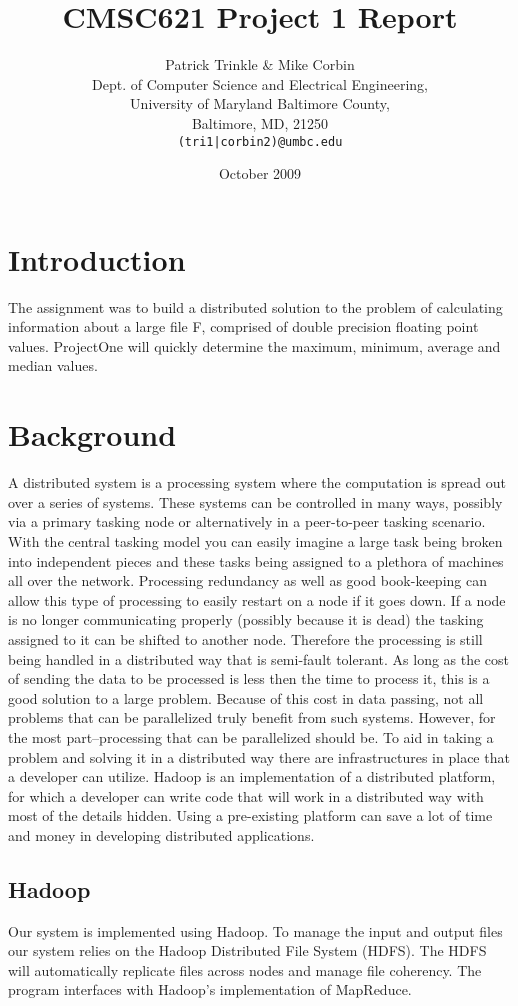 \documentclass[11pt]{article}
\title{CMSC621 Project 1 Report}
\author{Patrick Trinkle \& Mike Corbin\\
Dept. of Computer Science and Electrical Engineering,\\
University of Maryland Baltimore County,\\
Baltimore, MD, 21250\\
\texttt{(tri1|corbin2)@umbc.edu}}
\date{October 2009}
\begin{document}
\maketitle

\section{Introduction}
The assignment was to build a distributed solution to the problem of calculating information about a large file F, comprised of double precision floating point values.  ProjectOne will quickly determine the maximum, minimum, average and median values.

\section{Background}
A distributed system is a processing system where the computation is spread out over a series of systems.  These systems can be controlled in many ways, possibly via a primary tasking node or alternatively in a peer-to-peer tasking scenario.  With the central tasking model you can easily imagine a large task being broken into independent pieces and these tasks being assigned to a plethora of machines all over the network.  Processing redundancy as well as good book-keeping can allow this type of processing to easily restart on a node if it goes down.  If a node is no longer communicating properly (possibly because it is dead) the tasking assigned to it can be shifted to another node.  Therefore the processing is still being handled in a distributed way that is semi-fault tolerant.  As long as the cost of sending the data to be processed is less then the time to process it, this is a good solution to a large problem.  Because of this cost in data passing, not all problems that can be parallelized truly benefit from such systems.  However, for the most part--processing that can be parallelized should be.  To aid in taking a problem and solving it in a distributed way there are infrastructures in place that a developer can utilize.  Hadoop is an implementation of a distributed platform, for which a developer can write code that will work in a distributed way with most of the details hidden.  Using a pre-existing platform can save a lot of time and money in developing distributed applications.

\subsection{Hadoop}
Our system is implemented using Hadoop.  To manage the input and output files our system relies on  the Hadoop Distributed File System (HDFS).  The HDFS will automatically replicate files across nodes and manage file coherency.  The program interfaces with Hadoop's implementation of MapReduce.
\end{document}
